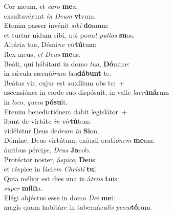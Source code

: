\evenverse Cor meum, et \textit{ca}\textit{ro} \textbf{me}a:~\*\\
\evenverse exsultavérunt \textit{in} \textit{De}\textit{um} \textbf{vi}vum.\\
\oddverse Etenim passer invénit \textit{si}\textit{bi} \textbf{do}mum:~\*\\
\oddverse et turtur nidum sibi, ubi po\textit{nat} \textit{pul}\textit{los} \textbf{su}os.\\
\evenverse Altária tua, Dómi\textit{ne} \textit{vir}\textbf{tú}tum:~\*\\
\evenverse Rex meus, \textit{et} \textit{De}\textit{us} \textbf{me}us.\\
\oddverse Beáti, qui hábitant in domo \textit{tu}\textit{a}, \textbf{Dó}mine:~\*\\
\oddverse in sǽcula sæcu\textit{ló}\textit{rum} \textit{lau}\textbf{dá}\textbf{bunt} te.\\
\evenverse Beátus vir, cujus est auxílium abs te:~+\\
\evenverse  ascensiónes in corde suo dispósuit, in valle \textit{la}\textit{cri}\textbf{má}rum~\*\\
\evenverse in \textit{lo}\textit{co}, \textit{quem} \textbf{pó}\textbf{su}it.\\
\oddverse Etenim benedictiónem dabit legislátor~+\\
\oddverse  ibunt de virtúte \textit{in} \textit{vir}\textbf{tú}tem:~\*\\
\oddverse vidébitur Deus de\textit{ó}\textit{rum} \textit{in} \textbf{Si}on.\\
\evenverse Dómine, Deus virtútum, exáudi orati\textit{ó}\textit{nem} \textbf{me}am:~\*\\
\evenverse áuribus pérci\textit{pe}, \textit{De}\textit{us} \textbf{Ja}cob.\\
\oddverse Protéctor noster, á\textit{spi}\textit{ce}, \textbf{De}us:~\*\\
\oddverse et réspice in fáci\textit{em} \textit{Chri}\textit{sti} \textbf{tu}i.\\
\evenverse Quia mélior est dies una in á\textit{tri}\textit{is} \textbf{tu}is:~\*\\
\evenverse \textit{su}\textit{per} \textbf{míl}\textbf{li}a.\\
\oddverse Elégi abjéctus esse in domo \textit{De}\textit{i} \textbf{me}i:~\*\\
\oddverse magis quam habitáre in tabernácu\textit{lis} \textit{pec}\textit{ca}\textbf{tó}rum.\\
